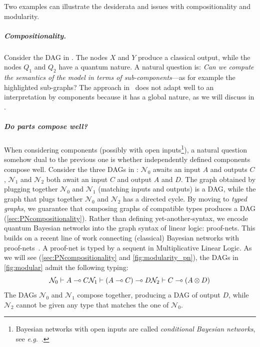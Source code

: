 \documentclass[10pt,a4paper]{article}
\newcommand*{\eg}{\emph{e.g.}\xspace}
\newcommand{\der}{\vdash}
\newcommand*{\lollipop}{\multimap}
\newcommand{\netN}{\mathcal N}
\newcommand{\N}{\netN}
\newcommand{\pn}{proof-net\xspace}
\begin{document}
Two examples can illustrate the desiderata and issues with compositionality and modularity.

\subparagraph{Compositionality.}

Consider the DAG in .
The nodes $X$ and $Y$ produce a classical output, while the nodes $Q_1$ and $Q_2$ have a quantum nature.
A natural question is:
\emph{Can we compute the semantics of the model in terms of sub-components}---as for example the highlighted sub-graphs? 
The approach in~\cite{GBN2014} does not adapt well to an interpretation by components because it has a global nature, as we will discuss in .

\subparagraph{Do parts compose well?}

When considering components (possibly with open inputs\footnote{Bayesian networks with open inputs are called \emph{conditional Bayesian networks}, see \eg~\cite{KollerBook}.}), a natural question somehow dual to the previous one is whether independently defined components compose well.
Consider the three DAGs in : $\N_0$ awaits an input $A$ and outputs $C$, $\N_1$ and $\N_2$ both await an input $C$ and output $A$ and $D$.
The graph obtained by plugging together $\N_0$ and $\N_1$ (matching inputs and outputs) is a DAG, while the graph that plugs together $\N_0$ and $\N_2$ has a directed cycle.
By moving to \emph{typed graphs}, we guarantee that composing graphs of compatible types produces a DAG (\cref{sec:PNcompositionality}).
Rather than defining yet-another-syntax, we encode quantum Bayesian networks into the graph syntax of linear logic: proof-nets.
This builds on a recent line of work connecting (classical) Bayesian networks with proof-nets~\cite{EhrhardFP23,popl24,BPN}.
A \pn is typed by a sequent in Multiplicative Linear Logic.
As we will see (\cref{sec:PNcompositionality} and \cref{fig:modularity_pn}), the DAGs in \cref{fig:modular} admit the following typing:
\begin{equation*}
\hfill \N_0\der A\lollipop C \hfill \N_1\der (A\lollipop C)\lollipop D \hfill \N_2\der C \lollipop (A \otimes D) \hfill
\end{equation*}
The DAGs $\N_0$ and $\N_1$ compose together, producing a DAG of output $D$, while $\N_2$ cannot be given any type that matches the one of $\N_0$.
\end{document}
